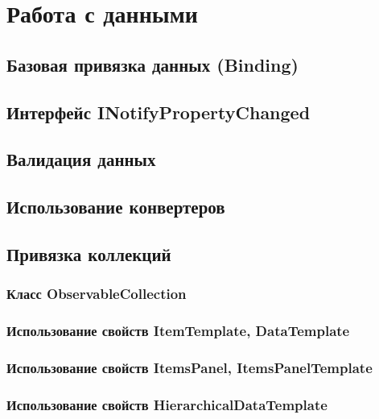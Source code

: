 \section{Работа с данными}

\subsection{Базовая привязка данных (Binding)}

\subsection{Интерфейс INotifyPropertyChanged}

\subsection{Валидация данных}

\subsection{Использование конвертеров}

\subsection{Привязка коллекций}


\subsubsection{Класс ObservableCollection}


\subsubsection{Использование свойств ItemTemplate, DataTemplate}


\subsubsection{Использование свойств ItemsPanel, ItemsPanelTemplate}


\subsubsection{Использование свойств HierarchicalDataTemplate}